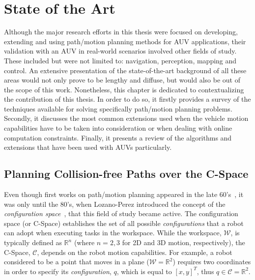
\chapter{State of the Art} %
\label{ch:state_of_the_art}

\ifpdf
    \graphicspath{{2_state_of_the_art/figures/PNG/}{2_state_of_the_art/figures/PDF/}{2_state_of_the_art/figures/}}
\else
    \graphicspath{{2_state_of_the_art/figures/EPS/}{2_state_of_the_art/figures/}}
\fi


Although the major research efforts in this thesis were focused on developing,
extending and using path/motion planning methods for \ac{AUV} applications,
their validation with an \ac{AUV} in real-world scenarios involved other fields
of study. These included but were not limited to: navigation, perception,
mapping and control. An extensive presentation of the state-of-the-art
background of all these areas would not only prove to be lengthy and diffuse,
but would also be out of the scope of this work. Nonetheless, this chapter is
dedicated to contextualizing the contribution of this thesis. In order to do so,
it firstly provides a survey of the techniques available for solving
specifically path/motion planning problems. Secondly, it discusses the most
common extensions used when the vehicle motion capabilities have to be taken
into consideration or when dealing with online computation constraints.
Finally, it presents a review of the algorithms and extensions that have been
used with \acp{AUV} particularly.

\section{Planning Collision-free Paths over the C-Space}

Even though first works on path/motion planning appeared in the late
60's~\cite{Nilsson1969}, it was only until the 80's, when Lozano-Perez
introduced the concept of the \textit{configuration
space}~\cite{Lozano-Perez1983,Lozano-Perez1984,Lozano-Perez1987}, that this
field of study became active. The configuration space (or \ac{C-Space})
establishes the set of all possible \textit{configurations} that a robot can
adopt when executing tasks in the workspace. While the workspace, $\mathcal{W}$,
is typically defined as $\mathbb{R}^n$ (where $n=2,3$ for \ac{2D} and \ac{3D}
motion, respectively), the \ac{C-Space}, $\mathcal{C}$, depends on the robot
motion capabilities. For example, a robot considered to be a point that moves in
a plane (\ie $\mathcal{W}=\mathbb{R}^2$) requires two coordinates in order to
specify its \textit{configuration}, $q$,  which is equal to $[x,y]^T$, thus $q
\in \mathcal{C}=\mathbb{R}^2$. 

